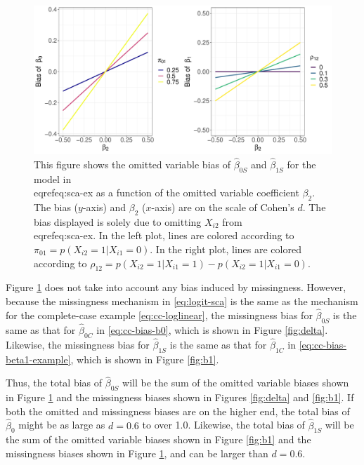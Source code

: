 \documentclass[
]{article}
\begin{document}
\begin{figure}
\begin{center}
\includegraphics[width = \textwidth]{./graphics/omitted_var_bias}
\end{center}
\caption{This figure shows the omitted variable bias of $\hat{\beta}_{0S}$ and $\hat{\beta}_{1S}$ for the model in \\eqref{eq:sca-ex} as a function of the omitted variable coefficient $\beta_2$. The bias ($y$-axis) and $\beta_2$ ($x$-axis) are on the scale of Cohen's $d$. The bias displayed is solely due to omitting $X_{i2}$ from \\eqref{eq:sca-ex}. In the left plot, lines are colored according to $\pi_{01} = p(X_{i2} = 1 | X_{i1} = 0)$. In the right plot, lines are colored according to $\rho_{12} = p(X_{i2} = 1 | X_{i1} = 1) - p(X_{i2} = 1 | X_{i1} = 0)$.}
\label{fig:omitted-bias}
\end{figure}

Figure \ref{fig:omitted-bias} does not take into account any bias induced by missingness.
However, because the missingness mechanism in \eqref{eq:logit-sca} is the same as the mechanism for the complete-case example \eqref{eq:cc-loglinear}, the missingness bias for \(\hat{\beta}_{0S}\) is the same as that for \(\hat{\beta}_{0C}\) in \eqref{eq:cc-bias-b0}, which is shown in Figure \ref{fig:delta}.
Likewise, the missingness bias for \(\hat{\beta}_{1S}\) is the same as that for \(\hat{\beta}_{1C}\) in \eqref{eq:cc-bias-beta1-example}, which is shown in Figure \ref{fig:b1}.

Thus, the total bias of \(\hat{\beta}_{0S}\) will be the sum of the omitted variable biases shown in Figure \ref{fig:omitted-bias} and the missingness biases shown in Figures \ref{fig:delta} and \ref{fig:b1}.
If both the omitted and missingness biases are on the higher end, the total bias of \(\hat{\beta}_0\) might be as large as \(d = 0.6\) to over 1.0.
Likewise, the total bias of \(\hat{\beta}_{1S}\) will be the sum of the omitted variable biases shown in Figure \ref{fig:b1} and the missingness biases shown in Figure \ref{fig:omitted-bias}, and can be larger than \(d = 0.6\).
\end{document}
